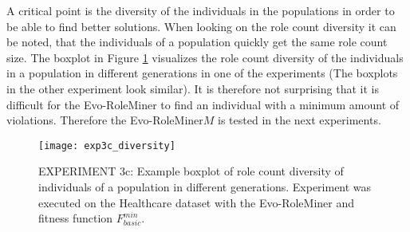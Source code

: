 A critical point is the diversity of the individuals in the populations in order to be able to find better solutions. When looking on the role count diversity it can be noted, that the individuals of a population quickly get the same role count size. The boxplot in Figure \ref{fig:exp3c_diversity} visualizes the role count diversity of the individuals in a population in different generations in one of the experiments (The boxplots in the other experiment look similar). It is therefore not surprising that it is difficult for the Evo-RoleMiner to find an individual with a minimum amount of violations. Therefore the Evo-RoleMiner$M$ is tested in the next experiments.

\begin{figure}[H]
	\centering
	\texttt{[image: exp3c\_diversity]}
	\caption{EXPERIMENT 3c: Example boxplot of role count diversity of individuals of a population in different generations. Experiment was executed on the Healthcare dataset with the Evo-RoleMiner and fitness function $F_{basic}^{min}$.}
	\label{fig:exp3c_diversity}
\end{figure}